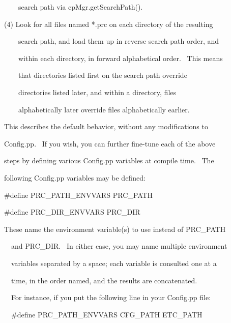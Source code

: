 \documentclass[a4paper]{article}
\begin{document}
{\color{black}
\ \ \ \ search path via cpMgr.getSearchPath().}


\bigskip

{\color{black}
(4) Look for all files named *.prc on each directory of the resulting}

{\color{black}
\ \ \ \ search path, and load them up in reverse search path order, and}

{\color{black}
\ \ \ \ within each directory, in forward alphabetical order. \ This means}

{\color{black}
\ \ \ \ that directories listed first on the search path override}

{\color{black}
\ \ \ \ directories listed later, and within a directory, files}

{\color{black}
\ \ \ \ alphabetically later override files alphabetically earlier.}

\clearpage
\bigskip


\bigskip

{\color{black}
This describes the default behavior, without any modifications to}

{\color{black}
Config.pp. \ If you wish, you can further fine-tune each of the above}

{\color{black}
steps by defining various Config.pp variables at compile time. \ The}

{\color{black}
following Config.pp variables may be defined:}


\bigskip

{\color{black}
\#define PRC\_PATH\_ENVVARS PRC\_PATH}

{\color{black}
\#define PRC\_DIR\_ENVVARS PRC\_DIR}

{\color{black}
These name the environment variable(s) to use instead of PRC\_PATH}

{\color{black}
\ \ and PRC\_DIR. \ In either case, you may name multiple environment}

{\color{black}
\ \ variables separated by a space; each variable is consulted one at a}

{\color{black}
\ \ time, in the order named, and the results are concatenated.}


\bigskip

{\color{black}
\ \ For instance, if you put the following line in your Config.pp file:}


\bigskip

{\color{black}
\ \ \#define PRC\_PATH\_ENVVARS CFG\_PATH ETC\_PATH}


\bigskip
\end{document}
